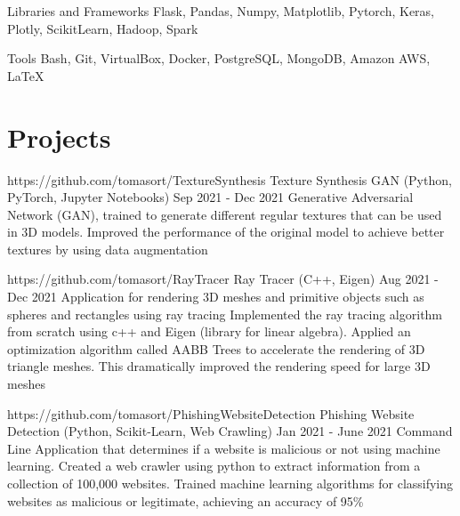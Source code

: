 \documentclass[letterpaper,10pt]{article}
\begin{document}
  \skillItem
    {Libraries and Frameworks}
    {Flask, 
      Pandas, 
      Numpy,
      Matplotlib, 
      Pytorch, 
      Keras, 
      Plotly, 
      ScikitLearn, 
      Hadoop, 
      Spark}

  \skillItem
    {Tools}
    {Bash, 
      Git, 
      VirtualBox, 
      Docker, 
      PostgreSQL, 
      MongoDB, 
      Amazon AWS, 
      \LaTeX\ }
  \vspace{3pt}
\sectionEnd

\section{Projects}
\sectionStart


  \projectHeading
    {https://github.com/tomasort/TextureSynthesis}
    {Texture Synthesis GAN}
    {(Python, PyTorch, Jupyter Notebooks)}
    {Sep 2021 - Dec 2021}
    {Generative Adversarial Network (GAN), trained to generate different regular textures that can be used in 3D models.}
  \listStart
    \bulletItem
      {Improved the performance of the original model to achieve better textures by using data augmentation }
  \listEnd


  \projectHeading
    {https://github.com/tomasort/RayTracer}
    {Ray Tracer}
    {(C++, Eigen)}
    {Aug 2021 - Dec 2021}
    {Application for rendering 3D meshes and primitive objects such as spheres and rectangles using ray tracing}
  \listStart
    \bulletItem
      {Implemented the ray tracing algorithm from scratch using c++ and Eigen (library for linear algebra).}
    \bulletItem
      {Applied an optimization algorithm called AABB Trees to accelerate the rendering of 3D triangle meshes. This dramatically improved the rendering speed for large 3D meshes }
  \listEnd

  \projectHeading
    {https://github.com/tomasort/PhishingWebsiteDetection}
    {Phishing Website Detection}
    {(Python, Scikit-Learn, Web Crawling)}
    {Jan 2021 - June 2021}
    {Command Line Application that determines if a website is malicious or not using machine learning.}
  \listStart
    \bulletItem
      {Created a web crawler using python to extract information from a collection of 100,000 websites. }
    \bulletItem
      {Trained machine learning algorithms for classifying websites as malicious or legitimate, achieving an accuracy of 95\%}
  \listEnd
\end{document}
